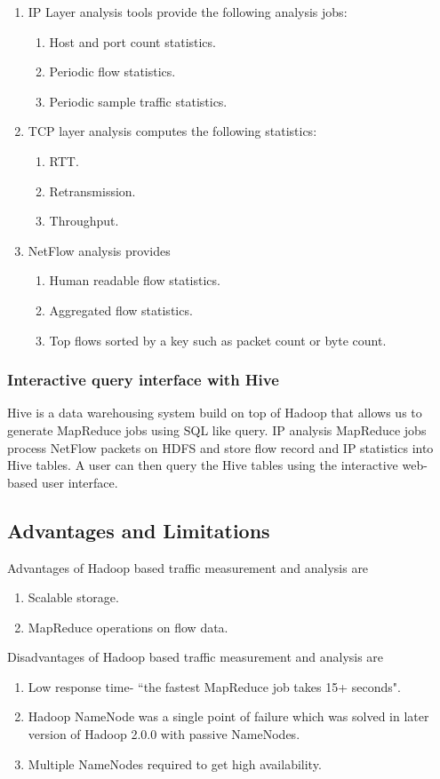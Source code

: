 	\begin{enumerate}
	 \item IP Layer analysis tools provide the following analysis jobs:
	      \begin{enumerate}
	       \item Host and port count statistics.
	       \item Periodic flow statistics.
	       \item Periodic sample traffic statistics.
	      \end{enumerate}
	 \item TCP layer analysis computes the following statistics:
	       \begin{enumerate}
	        \item RTT.
	        \item Retransmission.
	        \item Throughput.
	       \end{enumerate}
	\item NetFlow analysis provides 
	      \begin{enumerate}
	       \item Human readable flow statistics.
	       \item Aggregated flow statistics.
	       \item Top flows sorted by a key such as packet count or byte count. 
	      \end{enumerate}
	\end{enumerate}

      \subsubsection{Interactive query interface with Hive}
      Hive is a data warehousing system build on top of Hadoop that allows us to generate MapReduce jobs using SQL like query.
      IP analysis MapReduce jobs process NetFlow packets on HDFS and  store flow record and IP statistics into
      Hive tables. A user can then query the Hive tables using the interactive web-based user interface.
      
      \subsection{Advantages and Limitations}
      Advantages of Hadoop based traffic  measurement and analysis are 
	\begin{enumerate}
	  \item Scalable storage.
	  \item MapReduce operations on flow data.
	\end{enumerate}
      Disadvantages of Hadoop based traffic  measurement and analysis are
	\begin{enumerate}
	 \item Low response time- ``the fastest MapReduce job takes 15+ seconds"\cite{ha}.
	 \item Hadoop NameNode was a single point of failure which was solved in later version of 
	        Hadoop 2.0.0 with passive NameNodes.
	 \item Multiple NameNodes required to get high availability\cite{ha}.
	\end{enumerate}

